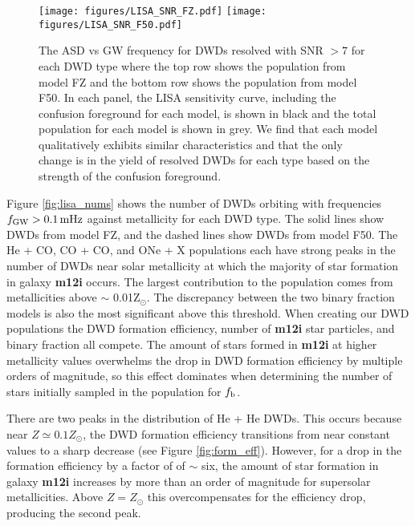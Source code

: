 \documentclass[twocolumn]{aastex631}
\begin{document}
\begin{figure*}
	\texttt{[image: figures/LISA\_SNR\_FZ.pdf]}
	\texttt{[image: figures/LISA\_SNR\_F50.pdf]}
    \caption{The ASD vs GW frequency for DWDs resolved with SNR $> 7$ for each DWD type where the top row shows the population from model FZ and the bottom row shows the population from model F50. In each panel, the LISA sensitivity curve, including the confusion foreground for each model, is shown in black and the total population for each model is shown in grey. We find that each model qualitatively exhibits similar characteristics and that the only change is in the yield of resolved DWDs for each type based on the strength of the confusion foreground.}
    \label{fig:LISA_SNR}
\end{figure*}

Figure \ref{fig:lisa_nums} shows the number of DWDs orbiting with frequencies $f_{\rm{GW}} > 0.1\,\rm{mHz}$ against metallicity for each DWD type. The solid lines show DWDs from model FZ, and the dashed lines show DWDs from model F50. The He + CO, CO + CO, and ONe + X populations each have strong peaks in the number of DWDs near solar metallicity at which the majority of star formation in galaxy {\bf{m12i}} occurs. The largest contribution to the population comes from metallicities above $\sim$ 0.01Z$_\odot$. The discrepancy between the two binary fraction models is also the most significant above this threshold. When creating our DWD populations the DWD formation efficiency, number of \textbf{m12i} star particles, and binary fraction all compete. The amount of stars formed in \textbf{m12i} at higher metallicity values overwhelms the drop in DWD formation efficiency by multiple orders of magnitude, so this effect dominates when determining the number of stars initially sampled in the population for $f_{\rm{b}}$. 

There are two peaks in the distribution of He + He DWDs. This occurs because near $Z\simeq 0.1Z_\odot$, the DWD formation efficiency transitions from near constant values to a sharp decrease (see Figure \ref{fig:form_eff}). However, for a drop in the formation efficiency by a factor of of $\sim$ six, the amount of star formation in galaxy \textbf{m12i} increases by more than an order of magnitude for supersolar metallicities. Above $Z=Z_\odot$ this overcompensates for the efficiency drop, producing the second peak.
\end{document}
